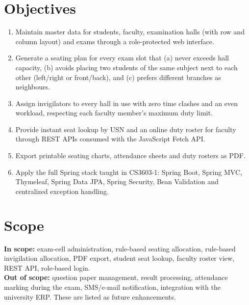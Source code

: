 \documentclass[11pt,a4paper]{article}
\begin{document}
\section{Objectives}
\begin{enumerate}
  \item Maintain master data for students, faculty, examination halls (with row and column layout) and exams through a role-protected web interface.
  \item Generate a seating plan for every exam slot that (a) never exceeds hall capacity, (b) avoids placing two students of the same subject next to each other (left/right or front/back), and (c) prefers different branches as neighbours.
  \item Assign invigilators to every hall in use with zero time clashes and an even workload, respecting each faculty member's maximum duty limit.
  \item Provide instant seat lookup by USN and an online duty roster for faculty through REST APIs consumed with the JavaScript Fetch API.
  \item Export printable seating charts, attendance sheets and duty rosters as PDF.
  \item Apply the full Spring stack taught in CS3603-1: Spring Boot, Spring MVC, Thymeleaf, Spring Data JPA, Spring Security, Bean Validation and centralized exception handling.
\end{enumerate}

\section{Scope}
\textbf{In scope:} exam-cell administration, rule-based seating allocation, rule-based invigilation allocation, PDF export, student seat lookup, faculty roster view, REST API, role-based login.\\
\textbf{Out of scope:} question paper management, result processing, attendance marking during the exam, SMS/e-mail notification, integration with the university ERP. These are listed as future enhancements.
\end{document}
